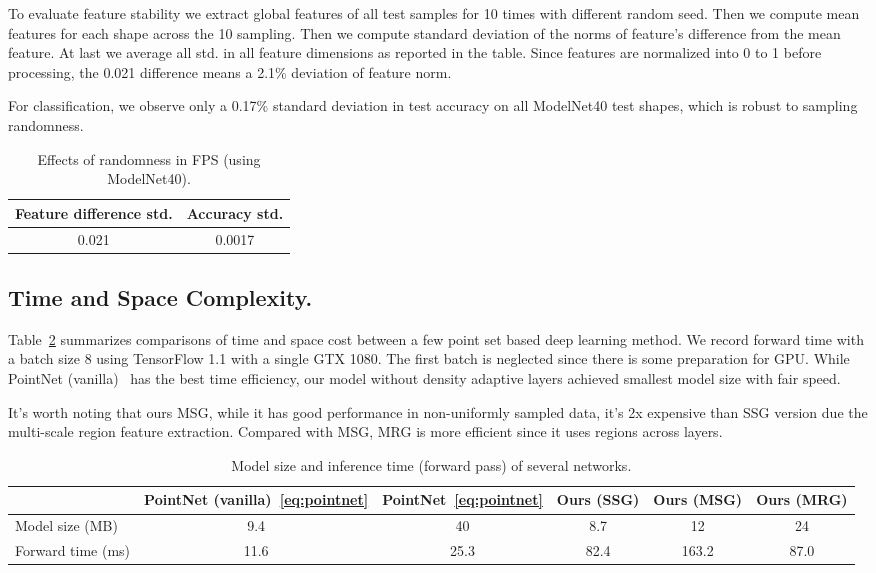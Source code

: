 To evaluate feature stability we extract global features of all test samples for 10 times with different random seed. Then we compute mean features for each shape across the 10 sampling. Then we compute standard deviation of the norms of feature's difference from the mean feature. At last we average all std. in all feature dimensions as reported in the table. Since features are normalized into 0 to 1 before processing, the 0.021 difference means a 2.1\% deviation of feature norm.

For classification, we observe only a 0.17\% standard deviation in test accuracy on all ModelNet40 test shapes, which is robust to sampling randomness.
\begin{table}[h!]
\centering
\begin{tabular}{cc}
\toprule
Feature difference std. & Accuracy std. \\ \midrule
 0.021 & 0.0017\\ \bottomrule
\end{tabular}
\caption{Effects of randomness in FPS (using ModelNet40). %
}
\label{tab:fps}
\end{table}



\subsection{Time and Space Complexity.}

Table~\ref{tab:timespace} summarizes comparisons of time and space cost between a few point set based deep learning method. We record forward time with a batch size 8 using TensorFlow 1.1 with a single GTX 1080. The first batch is neglected since there is some preparation for GPU. While PointNet (vanilla)~\cite{qi2016pointnet} has the best time efficiency, our model without density adaptive layers achieved smallest model size with fair speed.

It's worth noting that ours MSG, while it has good performance in non-uniformly sampled data, it's 2x expensive than SSG version due the multi-scale region feature extraction. Compared with MSG, MRG is more efficient since it uses regions across layers.

\begin{table}[h]
    \centering
    \small
    \begin{tabular}{lccccc}
        \toprule
        & PointNet (vanilla)~\ref{eq:pointnet} & PointNet~\ref{eq:pointnet} & Ours (SSG) & Ours (MSG) & Ours (MRG) \\ \midrule
        Model size (MB) & 9.4 & 40 & 8.7 & 12 & 24 \\
        Forward time (ms) & 11.6 & 25.3 & 82.4& 163.2& 87.0\\
        \bottomrule
    \end{tabular}
    \caption{Model size and inference time (forward pass) of several networks.}
    \label{tab:timespace}
\end{table}